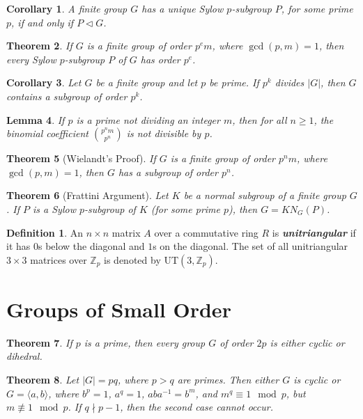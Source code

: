 \documentclass[12pt]{report}
\newtheorem{theorem}{Theorem}[chapter]
\newtheorem{corollary}[theorem]{Corollary}
\newtheorem{lemma}[theorem]{Lemma}
\theoremstyle{definition}
\newtheorem*{definition}{Definition}
\newcommand{\term}[1]{\textbf{\textit{#1}}}
\begin{document}
\begin{corollary}
	A finite group $G$ has a unique Sylow $p$-subgroup $P$, for some prime $p$, if and only if $P\vartriangleleft G$.
\end{corollary}

\begin{theorem}
	If $G$ is a finite group of order $p{^e}m$, where $\gcd(p,m)=1$, then every Sylow $p$-subgroup $P$ of $G$ has order $p^e$.
\end{theorem}

\begin{corollary}
	Let $G$ be a finite group and let $p$ be prime. If $p^k$ divides $|G|$, then $G$ contains a subgroup of order $p^k$.
\end{corollary}

\begin{lemma}
	If $p$ is a prime not dividing an integer $m$, then for all $n\geq 1$, the binomial coefficient $\binom{p{^n}m}{p^n}$ is not divisible by $p$.
\end{lemma}

\begin{theorem}[Wielandt's Proof]
	If $G$ is a finite group of order $p{^n}m$, where $\gcd(p,m)=1$, then $G$ has a subgroup of order $p^n$.
\end{theorem}

\begin{theorem}[Frattini Argument]
	Let $K$ be a normal subgroup of a finite group $G$. If $P$ is a Sylow $p$-subgroup of $K$ (for some prime $p$), then $G=KN_G(P)$.
\end{theorem}

\begin{definition}
	An $n\times n$ matrix $A$ over a commutative ring $R$ is \term{unitriangular} if it has $0$s below the diagonal and $1$s on the diagonal.
	The set of all unitriangular $3\times 3$ matrices over $\mathbb{Z}_p$ is denoted by $\mathrm{UT}(3,\mathbb{Z}_p)$.
\end{definition}

\section{Groups of Small Order}
\begin{theorem}
	If $p$ is a prime, then every group $G$ of order $2p$ is either cyclic or dihedral.
\end{theorem}

\begin{theorem}
	Let $|G|=pq$, where $p>q$ are primes. Then either $G$ is cyclic or $G=\langle a,b\rangle$, where $b^p=1$, $a^q=1$, $aba^{-1}=b^m$, and $m^q\equiv 1\mod p$, but $m\not\equiv 1\mod p$.
	If $q\nmid p-1$, then the second case cannot occur.
\end{theorem}
\end{document}
